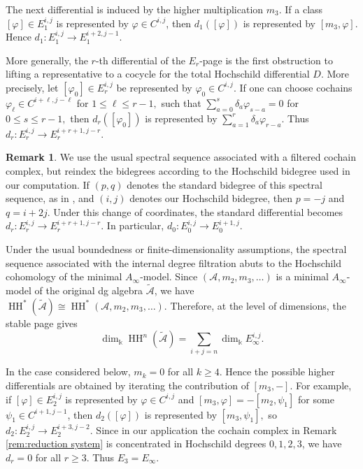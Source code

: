 \documentclass[a4paper, reqno, 11pt]{amsart}
\theoremstyle{definition}
\newtheorem{remark}[theorem]{Remark}
\begin{document}
The next differential is induced by the higher multiplication \(m_3\). If a class
\([\varphi]\in E_1^{i,j}\) is represented by \(\varphi\in C^{i,j}\), then
\(d_1([\varphi])\) is represented by \([m_3,\varphi]\). Hence \(d_1:E_1^{i,j}\longrightarrow E_1^{i+2,j-1}.\)

More generally, the \(r\)-th differential of the $E_r$-page is the first obstruction to lifting a
representative to a cocycle for the total Hochschild differential \(D\). More
precisely, let \([\varphi_0]\in E_r^{i,j}\) be represented by
\(\varphi_0\in C^{i,j}\). If one can choose cochains \(\varphi_\ell\in C^{i+\ell,j-\ell}\) for \( 1\leq \ell\leq r-1,\)
such that \(\sum\limits_{a=0}^{s}\delta_a\varphi_{s-a}=0\) for \(0\leq s\leq r-1,\)
then \(d_r([\varphi_0])\) is represented by \(\sum\limits_{a=1}^{r}\delta_a\varphi_{r-a}.\)
Thus \(d_r:E_r^{i,j}\longrightarrow E_r^{i+r+1,j-r}.\)

\begin{remark}
	We use the usual spectral sequence associated with a filtered cochain complex,
	but reindex the bidegrees according to the Hochschild bidegree used in our
	computation. If \((p,q)\) denotes the standard bidegree of this spectral
	sequence, as in \cite[Definition 5.2.3]{Weibel1994}, and \((i,j)\) denotes our
	Hochschild bidegree, then \(p=-j\) and \(q=i+2j.\)
	Under this change of coordinates, the standard differential becomes
	\(
	d_r:E_r^{i,j}\longrightarrow E_r^{i+r+1,j-r}.
	\)
	In particular, \(d_0:E_0^{i,j}\to E_0^{i+1,j}\).
\end{remark}

Under the usual boundedness or finite-dimensionality assumptions, the spectral
sequence associated with the internal degree filtration abuts to the Hochschild
cohomology of the minimal \(A_\infty\)-model. Since \((\mathcal A,m_2,m_3,\ldots)\) is a minimal \(A_\infty\)-model of the
original dg algebra \(\widetilde{\mathcal A}\), we have
\(
\operatorname{HH}^\ast(\widetilde{\mathcal A})
\cong
\operatorname{HH}^\ast(\mathcal A,m_2,m_3,\ldots).
\)
Therefore, at the level of dimensions, the stable page gives
\[
\dim_{\Bbbk} \operatorname{HH}^n(\widetilde{\mathcal A})
=
\sum\limits_{i+j=n}\dim_{\Bbbk}E_\infty^{i,j}.
\]

In the case considered below, \(m_k=0\) for all \(k\geq 4\). Hence the possible
higher differentials are obtained by iterating the contribution of
\([m_3,-]\). For example, if \([\varphi]\in E_2^{i,j}\) is represented by \(\varphi\in C^{i,j}\) and \([m_3,\varphi]=-[m_2,\psi_1]\)
for some \(\psi_1\in C^{i+1,j-1}\), then \(d_2([\varphi])\) is represented by \([m_3,\psi_1],\)
so \(d_2:E_2^{i,j}\longrightarrow E_2^{i+3,j-2}.\)
Since in our application the cochain complex in Remark \ref{rem:reduction system} is concentrated
in Hochschild degrees \(0,1,2,3\), we have \(d_r=0\) for all \(r\geq 3\). Thus \(E_3=E_\infty.\)
\end{document}
